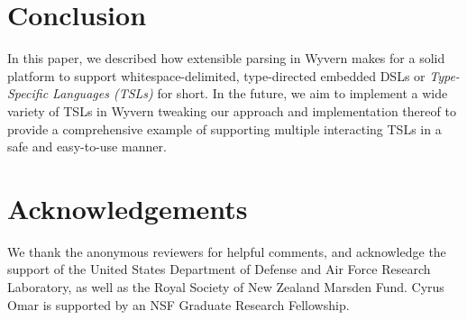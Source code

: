 \section{Conclusion} %
\label{s:conclusion}

In this paper, we described how extensible parsing in Wyvern makes for
a solid platform to support whitespace-delimited, type-directed embedded DSLs or \textit{Type-Specific Languages (TSLs)} for short.
In the
future, we aim to implement a wide variety of TSLs in Wyvern tweaking
our approach and implementation thereof to provide a comprehensive example of
supporting multiple interacting TSLs in a safe and easy-to-use manner.



\section*{Acknowledgements}
We thank the anonymous reviewers for helpful comments, and acknowledge the support of the United States Department of Defense and Air Force Research Laboratory, as well as the Royal Society of New Zealand Marsden Fund. Cyrus Omar is supported by an NSF Graduate Research Fellowship.
